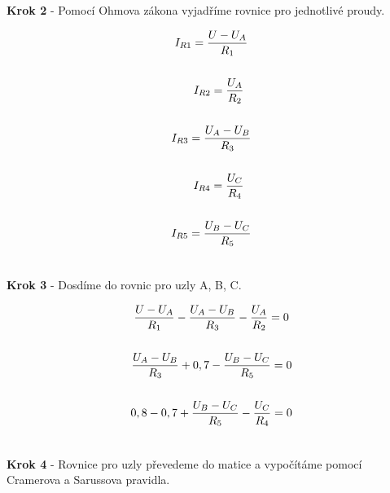 \begin{center}
\textbf{Krok 2} - Pomocí Ohmova zákona vyjadříme rovnice pro jednotlivé proudy. \\
\end{center}

\begin{gather*}
I_{R1} = \frac{U - U_A}{R_1} \\\\
\newline
\newline
I_{R2} = \frac{U_A}{R_2} \\\\
\newline
\newline
I_{R3} = \frac{U_A - U_B}{R_3} \\\\
\newline
\newline
I_{R4} = \frac{U_C}{R_4} \\\\
\newline
\newline
I_{R5} = \frac{U_B - U_C}{R_5} \\\\
\end{gather*}

\begin{center}
\textbf{Krok 3} - Dosdíme do rovnic pro uzly A, B, C. \\
\end{center}

\begin{gather*}
\frac{U - U_A}{R_1} - \frac{U_A - U_B}{R_3} - \frac{U_A}{R_2} = 0\\\\
\newline
\newline
\frac{U_A - U_B}{R_3} + 0,7 - \frac{U_B - U_C}{R_5} = 0 \\\\\
\newline
\newline
0,8 - 0,7 + \frac{U_B - U_C}{R_5} - \frac{U_C}{R_4} = 0 \\\\
\end{gather*}

\newpage


\begin{center}
\textbf{Krok 4} - Rovnice pro uzly převedeme do matice a vypočítáme pomocí Cramerova a Sarussova pravidla. \\
\end{center}

